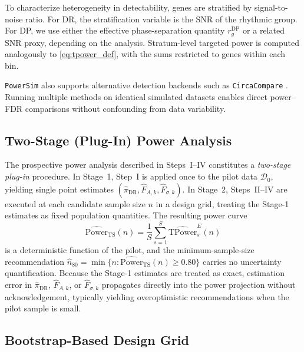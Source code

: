 \documentclass{article}
\newcommand{\software}[1]{\texttt{#1}}
\begin{document}
To characterize heterogeneity in detectability, genes are stratified by
signal-to-noise ratio. For DR, the stratification variable is the SNR of the
rhythmic group. For DP, we use either the effective phase-separation quantity
$r_g^{\mathrm{DP}}$ or a related SNR proxy, depending on the analysis. Stratum-level
targeted power is computed analogously to \eqref{eq:tpower_def}, with the
sums restricted to genes within each bin.

\software{PowerSim} also supports alternative detection backends such as
\software{CircaCompare} \cite{parsons2020circacompare}. Running multiple
methods on identical simulated datasets enables direct power--FDR comparisons
without confounding from data variability.

\subsection{Two-Stage (Plug-In) Power Analysis}
\label{sec:two_stage}

The prospective power analysis described in Steps~I--IV constitutes a
\emph{two-stage plug-in} procedure. In Stage~1, Step~I is applied once to
the pilot data $\mathcal{D}_0$, yielding single point estimates
$(\hat{\pi}_{\mathrm{DR}},\hat{F}_{A,k},\hat{F}_{\sigma,k})$. In Stage~2,
Steps~II--IV are executed at each candidate sample size $n$ in a design grid,
treating the Stage-1 estimates as fixed population quantities. The resulting
power curve
\begin{equation}
\widehat{\mathrm{Power}}_{\mathrm{TS}}(n)
=
\frac{1}{S}\sum_{s=1}^{S}\widehat{\mathrm{TPower}}_s^{E}(n)
\label{eq:two_stage_power}
\end{equation}
is a deterministic function of the pilot, and the minimum-sample-size
recommendation $\hat{n}_{80}=\min\!\bigl\{n:\widehat{\mathrm{Power}}_{\mathrm{TS}}(n)\geq 0.80\bigr\}$
carries no uncertainty quantification. Because the Stage-1 estimates are
treated as exact, estimation error in $\hat{\pi}_{\mathrm{DR}}$, $\hat{F}_{A,k}$,
or $\hat{F}_{\sigma,k}$ propagates directly into the power projection without
acknowledgement, typically yielding overoptimistic recommendations when the
pilot sample is small.

\subsection{Bootstrap-Based Design Grid}
\label{sec:bootstrap}
\end{document}
